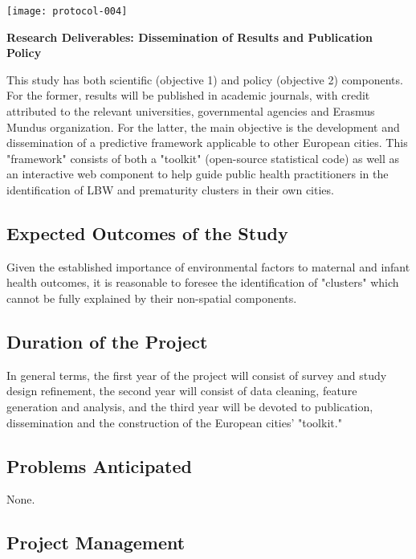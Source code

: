 \documentclass{article}
\begin{document}
\begin{multicols}{2}
\begin{center}
\texttt{[image: protocol-004]}
\end{center}




\noindent \textbf{Research Deliverables: Dissemination of Results and Publication Policy}

This study has both scientific (objective 1) and policy (objective 2) components.  For the former, results will be published in academic journals, with credit attributed to the relevant universities, governmental agencies and Erasmus Mundus organization.  For the latter, the main objective is the development and dissemination of a predictive framework applicable to other European cities.  This "framework" consists of both a "toolkit" (open-source statistical code) as well as an interactive web component to help guide public health practitioners in the identification of LBW and prematurity clusters in their own cities.  

\subsection*{Expected Outcomes of the Study}

Given the established importance of environmental factors to maternal and infant health outcomes, it is reasonable to foresee the identification of "clusters" which cannot be fully explained by their non-spatial components. 

\subsection*{Duration of the Project}

In general terms, the first year of the project will consist of survey and study design refinement, the second year will consist of data cleaning, feature generation and analysis, and the third year will be devoted to publication, dissemination and the construction of the European cities' "toolkit."  

\subsection*{Problems Anticipated}

None.

\subsection*{Project Management}


\end{multicols}
\end{document}
